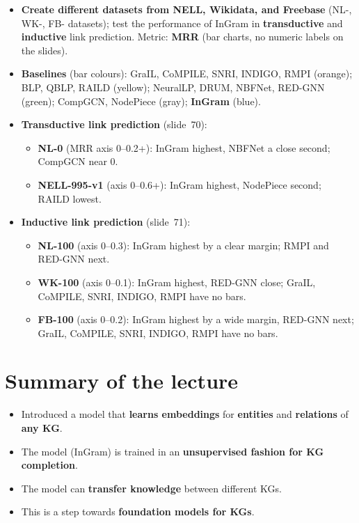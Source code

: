 \begin{itemize}
  \item \textbf{Create different datasets from NELL, Wikidata, and Freebase} (NL-, WK-,
    FB- datasets); test the performance of InGram in \textbf{transductive} and
    \textbf{inductive} link prediction. Metric: \textbf{MRR} (bar charts, no numeric
    labels on the slides).
  \item \textbf{Baselines} (bar colours): GraIL, CoMPILE, SNRI, INDIGO, RMPI (orange);
    BLP, QBLP, RAILD (yellow); NeuralLP, DRUM, NBFNet, RED-GNN (green); CompGCN,
    NodePiece (gray); \textbf{InGram} (blue).
  \item \textbf{Transductive link prediction} (slide~70):
    \begin{itemize}
      \item \textbf{NL-0} (MRR axis 0--0.2+): InGram highest, NBFNet a close second;
        CompGCN near 0.
      \item \textbf{NELL-995-v1} (axis 0--0.6+): InGram highest, NodePiece second; RAILD
        lowest.
    \end{itemize}
  \item \textbf{Inductive link prediction} (slide~71):
    \begin{itemize}
      \item \textbf{NL-100} (axis 0--0.3): InGram highest by a clear margin; RMPI and
        RED-GNN next.
      \item \textbf{WK-100} (axis 0--0.1): InGram highest, RED-GNN close; GraIL,
        CoMPILE, SNRI, INDIGO, RMPI have no bars.
      \item \textbf{FB-100} (axis 0--0.2): InGram highest by a wide margin, RED-GNN
        next; GraIL, CoMPILE, SNRI, INDIGO, RMPI have no bars.
    \end{itemize}
\end{itemize}

\section{Summary of the lecture}\label{sec:lec15-summary}

\begin{itemize}
  \item Introduced a model that \textbf{learns embeddings} for \textbf{entities} and
    \textbf{relations} of \textbf{any KG}.
  \item The model (InGram) is trained in an \textbf{unsupervised fashion for KG
    completion}.
  \item The model can \textbf{transfer knowledge} between different KGs.
  \item This is a step towards \textbf{foundation models for KGs}.
\end{itemize}

